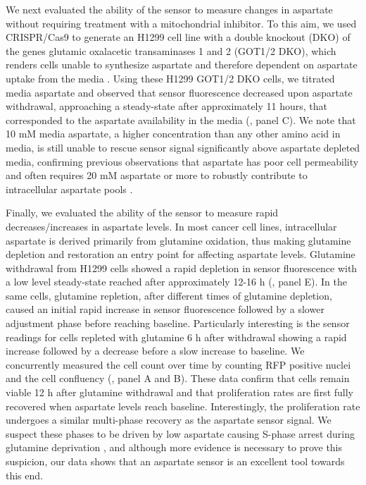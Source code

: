 \documentclass[9pt,lineno]{elife}
\begin{document}
We next evaluated the ability of the sensor to measure changes in aspartate without requiring treatment with a mitochondrial inhibitor.
To this aim, we used CRISPR/Cas9 to generate an H1299 cell line with a double knockout (DKO) of the genes glutamic oxalacetic transaminases 1 and 2 (GOT1/2 DKO), which renders cells unable to synthesize aspartate and therefore dependent on aspartate uptake from the media \citep{Garcia-Bermudez2022-qn}.
Using these H1299 GOT1/2 DKO cells, we titrated media aspartate and observed that sensor fluorescence decreased upon aspartate withdrawal, approaching a steady-state after approximately 11 hours, that corresponded to the aspartate availability in the media (, panel C).
We note that 10 mM media aspartate, a higher concentration than any other amino acid in media, is still unable to rescue sensor signal significantly above aspartate depleted media, confirming previous observations that aspartate has poor cell permeability and often requires 20 mM aspartate or more to robustly contribute to intracellular aspartate pools \citep{Sullivan2018-gz}.

Finally, we evaluated the ability of the sensor to measure rapid decreases/increases in aspartate levels.
In most cancer cell lines, intracellular aspartate is derived primarily from glutamine oxidation, thus making glutamine depletion and restoration an entry point for affecting aspartate levels.
Glutamine withdrawal from H1299 cells showed a rapid depletion in sensor fluorescence with a low level steady-state reached after approximately 12-16 h (, panel E).
In the same cells, glutamine repletion, after different times of glutamine depletion, caused an initial rapid increase in sensor fluorescence followed by a slower adjustment phase before reaching baseline.
Particularly interesting is the sensor readings for cells repleted with glutamine 6 h after withdrawal showing a rapid increase followed by a decrease before a slow increase to baseline.
We concurrently measured the cell count over time by counting RFP positive nuclei and the cell confluency (, panel A and B).
These data confirm that cells remain viable 12 h after glutamine withdrawal and that proliferation rates are first fully recovered when aspartate levels reach baseline.
Interestingly, the proliferation rate undergoes a similar multi-phase recovery as the aspartate sensor signal.
We suspect these phases to be driven by low aspartate causing S-phase arrest during glutamine deprivation \citep{Patel2016-ms}, and although more evidence is necessary to prove this suspicion, our data shows that an aspartate sensor is an excellent tool towards this end.
\end{document}
